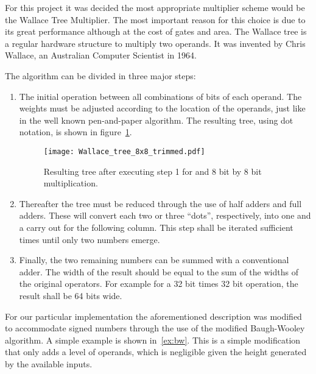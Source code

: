 For this project it was decided the most appropriate multiplier scheme would be the Wallace Tree Multiplier. The most important reason for this choice is due to its great performance although at the cost of gates and area.
The Wallace tree is a regular hardware structure to multiply two operands. It was invented by Chris Wallace, an Australian Computer Scientist in 1964.

The algorithm can be divided in three major steps:
\begin{enumerate}
\item The initial \AND operation between all combinations of bits of each operand. The weights must be adjusted according to the location of the operands, just like in the well known pen-and-paper algorithm. The resulting tree, using dot notation, is shown in figure~\ref{fig:wallace_tree}.

\begin{figure}[H]
\centering
\texttt{[image: Wallace\_tree\_8x8\_trimmed.pdf]}
\caption{Resulting tree after executing step 1 for and 8 bit by 8 bit multiplication.}
\label{fig:wallace_tree}
\end{figure}

\item Thereafter the tree must be reduced through the use of half adders and full adders. These will convert each two or three ``dots'', respectively, into one and a carry out for the following column. This step shall be iterated sufficient times until only two numbers emerge.

\item Finally, the two remaining numbers can be summed with a conventional adder. The width of the result should be equal to the sum of the widths of the original operators. For example for a 32 bit times 32 bit operation, the result shall be 64 bits wide. 
\end{enumerate}  

For our particular implementation the aforementioned description was modified to accommodate signed numbers through the use of the modified Baugh-Wooley algorithm. A simple example is shown in~\ref{ex:bw}. This is a simple modification that only adds a level of operands, which is negligible given the height generated by the available inputs. 

